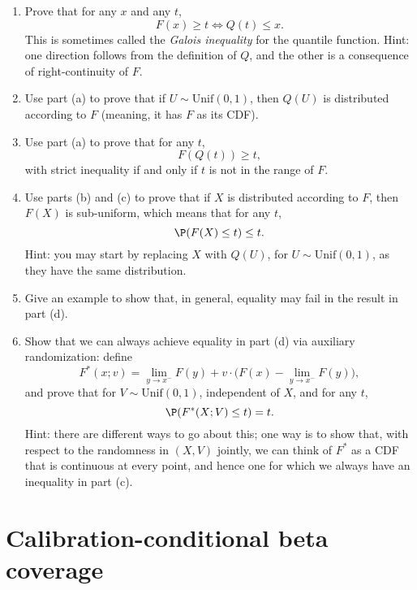 \documentclass{article}
\begin{document}
\begin{enumerate}[label=(\alph*)]
\item Prove that for any $x$ and any $t$, 
  \marginpar{\small [3 pts]}
  \[
  F(x) \geq t \iff Q(t) \leq x.
  \]
  This is sometimes called the \emph{Galois inequality} for the quantile
  function. Hint: one direction follows from the definition of $Q$, and the
  other is a consequence of right-continuity of $F$.  

\item Use part (a) to prove that if $U \sim \mathrm{Unif}(0,1)$, then $Q(U)$ is
  distributed according to $F$ (meaning, it has $F$ as its CDF). 
  \marginpar{\small [2 pts]}

\item Use part (a) to prove that for any $t$, 
  \marginpar{\small [2 pts]}
  \[
  F(Q(t)) \geq t,
  \]
  with strict inequality if and only if $t$ is not in the range of $F$. 

\item Use parts (b) and (c) to prove that if $X$ is distributed according to
  $F$, then $F(X)$ is sub-uniform, which means that for any $t$, 
  \marginpar{\small [3 pts]}
  \[
  \P(F(X) \leq t) \leq t.
  \]
  Hint: you may start by replacing $X$ with $Q(U)$, for $U \sim
  \mathrm{Unif}(0,1)$, as they have the same distribution.  
  
\item Give an example to show that, in general, equality may fail in the result
  in part (d).  
  \marginpar{\small [2 pts]}

\item Show that we can always achieve equality in part (d) via auxiliary
  randomization: define 
  \[
  F^*(x; v) =  \lim_{y \to x^-} F(y) + v \cdot \Big( F(x) - \lim_{y \to x^-}
  F(y) \Big), 
  \]
  and prove that for $V \sim \mathrm{Unif}(0,1)$, independent of $X$, and for
  any $t$,  
  \marginpar{\small [3 pts]}
  \[
  \P(F^*(X; V) \leq t) = t.
  \]
  Hint: there are different ways to go about this; one way is to show that, with
  respect to the randomness in $(X,V)$ jointly, we can think of $F^*$ as a CDF 
  that is continuous at every point, and hence one for which we always have an
  inequality in part (c). 
\end{enumerate}

\section{Calibration-conditional beta coverage}
\end{document}
